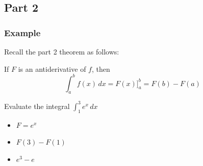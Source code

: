 \documentclass[t]{beamer}
\theoremstyle{plain}
\theoremstyle{definition}
\newcommand{\ds}{\displaystyle}
\newcommand{\dx}{\,dx}
\begin{document}
\subsection{Part 2}

\begin{frame}

\frametitle{Example}

Recall the part 2 theorem as follows:

\medskip

If $F$ is an antiderivative of $f$, then \[ \int_a^bf(x)\dx= F(x)\big]_{a}^{b} = F(b)-F(a)\] 

Evaluate the integral $\ds\int_{1}^{3} e^x \,dx$ \pause

\begin{itemize}
	\item $F = e^x$
	\item $F(3) - F(1)$
	\item $e^3 - e$
\end{itemize}

\end{frame}
\end{document}
